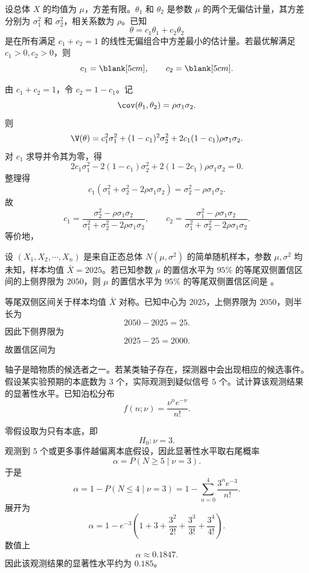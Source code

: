 \begin{question}
设总体 $X$ 的均值为 $\mu$，方差有限。$\theta_1$ 和 $\theta_2$ 是参数 $\mu$ 的两个无偏估计量，其方差分别为 $\sigma_1^2$ 和 $\sigma_2^2$，相关系数为 $\rho$。已知
\[
\theta=c_1\theta_1+c_2\theta_2
\]
是在所有满足 $c_1+c_2=1$ 的线性无偏组合中方差最小的估计量。若最优解满足 $c_1>0,c_2>0$，则
\[
c_1=\blank[5cm],\qquad c_2=\blank[5cm].
\]
\begin{solution}
由 $c_1+c_2=1$，令 $c_2=1-c_1$。记
\[
\cov(\theta_1,\theta_2)=\rho\sigma_1\sigma_2.
\]
则
\[
\V(\theta)
=c_1^2\sigma_1^2+(1-c_1)^2\sigma_2^2
+2c_1(1-c_1)\rho\sigma_1\sigma_2.
\]
对 $c_1$ 求导并令其为零，得
\[
2c_1\sigma_1^2-2(1-c_1)\sigma_2^2
+2(1-2c_1)\rho\sigma_1\sigma_2=0.
\]
整理得
\[
c_1(\sigma_1^2+\sigma_2^2-2\rho\sigma_1\sigma_2)
=\sigma_2^2-\rho\sigma_1\sigma_2.
\]
故
\[
c_1=\frac{\sigma_2^2-\rho\sigma_1\sigma_2}
{\sigma_1^2+\sigma_2^2-2\rho\sigma_1\sigma_2},
\qquad
c_2=\frac{\sigma_1^2-\rho\sigma_1\sigma_2}
{\sigma_1^2+\sigma_2^2-2\rho\sigma_1\sigma_2}.
\]
等价地，
\end{solution}
\end{question}

\begin{question}
设 $(X_1,X_2,\cdots,X_n)$ 是来自正态总体 $N(\mu,\sigma^2)$ 的简单随机样本，参数 $\mu,\sigma^2$ 均未知，样本均值 $\bar X=2025$。若已知参数 $\mu$ 的置信水平为 $95\%$ 的等尾双侧置信区间的上侧界限为 $2050$，则 $\mu$ 的置信水平为 $95\%$ 的等尾双侧置信区间是 \blank[4cm]。
\begin{solution}
等尾双侧区间关于样本均值 $\bar X$ 对称。已知中心为 $2025$，上侧界限为 $2050$，则半长为
\[
2050-2025=25.
\]
因此下侧界限为
\[
2025-25=2000.
\]
故置信区间为
\ansmath{[2000,2050]}
\end{solution}
\end{question}

\begin{question}
轴子是暗物质的候选者之一。若某类轴子存在，探测器中会出现相应的候选事件。假设某实验预期的本底数为 $3$ 个，实际观测到疑似信号 $5$ 个。试计算该观测结果的显著性水平。已知泊松分布
\[
f(n;\nu)=\frac{\nu^n e^{-\nu}}{n!}.
\]
\begin{solution}
零假设取为只有本底，即
\[
H_0:\nu=3.
\]
观测到 $5$ 个或更多事件越偏离本底假设，因此显著性水平取右尾概率
\[
\alpha=P(N\ge 5\mid \nu=3).
\]
于是
\[
\alpha=1-P(N\le 4\mid \nu=3)
=1-\sum_{n=0}^4\frac{3^ne^{-3}}{n!}.
\]
展开为
\[
\alpha=1-e^{-3}\left(1+3+\frac{3^2}{2!}+\frac{3^3}{3!}+\frac{3^4}{4!}\right).
\]
数值上
\[
\alpha\approx 0.1847.
\]
因此该观测结果的显著性水平约为 $0.185$。
\end{solution}
\end{question}

